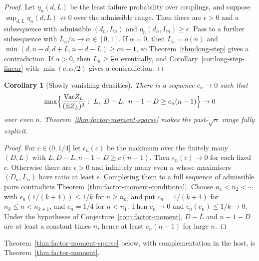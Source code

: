 \documentclass[11pt]{article}
\newtheorem{corollary}[theorem]{Corollary}
\newcommand{\EE}{\mathbb{E}}
\newcommand{\Var}{\mathrm{Var}}
\begin{document}
\begin{proof}
Let \(\eta_n(d,L)\) be the least failure probability over couplings, and suppose
\(\sup_{d,L}\eta_n(d,L)\not\to0\) over the admissible range.
Then there are \(\epsilon>0\) and a subsequence with admissible \((d_n,L_n)\)
and \(\eta_n(d_n,L_n)\ge\epsilon\). Pass to a further subsequence with
\(L_n/n\to\alpha\in[0,1]\).
If \(\alpha=0\), then \(L_n=o(n)\) and
\(\min(d,n-d,d+L,n-d-L)\ge cn-1\), so Theorem~\ref{thm:long-step} gives a
contradiction.
If \(\alpha>0\), then \(L_n\ge\frac\alpha2n\) eventually, and
Corollary~\ref{cor:long-step-linear} with \(\min(c,\alpha/2)\) gives a
contradiction.
\end{proof}

\begin{corollary}[Slowly vanishing densities]
\label{cor:factor-moment-diagonal}
There is a sequence \(c_n\to0\) such that
\[
\max\Bigl\{\frac{\Var Z_L}{(\EE Z_L)^2}:\ L,\ D-L,\ n-1-D\ge c_n(n-1)\Bigr\}\to0
\]
over even \(n\). Theorem~\ref{thm:factor-moment-sparse} makes the
past-\(\sqrt{n}\) range fully explicit.
\end{corollary}

\begin{proof}
For \(c\in(0,1/4]\) let \(\epsilon_n(c)\) be the maximum over the finitely many
\((D,L)\) with \(L,D-L,n-1-D\ge c(n-1)\).
Then \(\epsilon_n(c)\to0\) for each fixed \(c\).
Otherwise there are \(\epsilon>0\) and infinitely many even \(n\) whose maximisers
\((D_n,L_n)\) have ratio at least \(\epsilon\). Completing them to a full
sequence of admissible pairs contradicts
Theorem~\ref{thm:factor-moment-conditional}.
Choose \(n_1<n_2<\cdots\) with \(\epsilon_n(1/(k+4))\le1/k\) for \(n\ge n_k\), and put
\(c_n=1/(k+4)\) for \(n_k\le n<n_{k+1}\), and \(c_n=1/4\) for \(n<n_1\).
Then \(c_n\to0\) and \(\epsilon_n(c_n)\le1/k\to0\).
Under the hypotheses of Conjecture~\ref{conj:factor-moment},
\(D-L\) and \(n-1-D\) are at least a constant times \(n\), hence at least
\(c_n(n-1)\) for large \(n\).
\end{proof}

Theorem~\ref{thm:factor-moment-sparse} below, with complementation in the host,
is Theorem~\ref{thm:factor-moment}.
\end{document}
